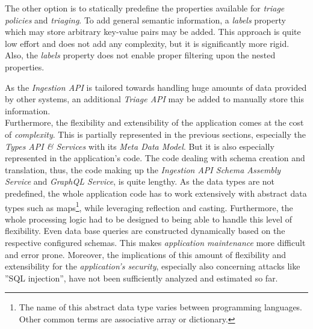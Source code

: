 The other option is to statically predefine the properties available for \emph{triage policies} and \emph{triaging}. To add general semantic information, a \emph{labels} property which may store arbitrary key-value pairs may be added. This approach is quite low effort and does not add any complexity, but it is significantly more rigid. Also, the \emph{labels} property does not enable proper filtering upon the nested properties.\par
As the \emph{Ingestion API} is tailored towards handling huge amounts of data provided by other systems, an additional \emph{Triage API} may be added to manually store this information.\\

Furthermore, the flexibility and extensibility of the application comes at the cost of \emph{complexity}. This is partially represented in the previous sections, especially the \emph{Types API \& Services} with its \emph{Meta Data Model}. But it is also especially represented in the application's code. The code dealing with schema creation and translation, thus, the code making up the \emph{Ingestion API Schema Assembly Service} and \emph{GraphQL Service}, is quite lengthy. As the data types are not predefined, the whole application code has to work extensively with abstract data types such as maps\footnote{The name of this abstract data type varies between programming languages. Other common terms are associative array or dictionary.}, while leveraging reflection and casting. Furthermore, the whole processing logic had to be designed to being able to handle this level of flexibility. Even data base queries are constructed dynamically based on the respective configured schemas. This makes \emph{application maintenance} more difficult and error prone. Moreover, the implications of this amount of flexibility and extensibility for the \emph{application's security}, especially also concerning attacks like ''SQL injection'', have not been sufficiently analyzed and estimated so far. 